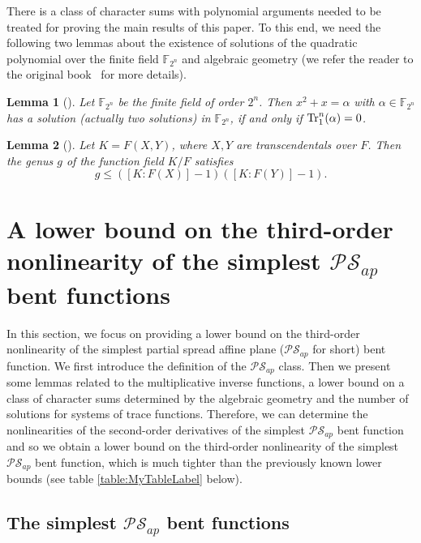 \documentclass{article}
\newcommand{\F}{\mathbb{F}}
\newcommand{\0}{\textbf{0}}
\newcommand{\1}{\textbf{1}}
\theoremstyle{plain}
\newtheorem{lemma}{Lemma}
\begin{document}
    There is a class of character sums with polynomial arguments needed to be treated for proving the main results of this paper.
    To this end, we need the following two lemmas about the existence of solutions of the quadratic polynomial over the finite field $\F_{2^n}$ and algebraic geometry (we refer the reader to the original book~\cite{Stichtenoth2008book_algebraicfunctionfieldsandcodes} for more details).
    \begin{lemma}[\cite{Lidl1997FiniteFieldBook}]\label{lemma:hilbert90}
        Let $\F_{2^n}$ be the finite field of order $2^n$.
        Then $x^2+x=\alpha$ with $\alpha\in\F_{2^n}$ has a solution (actually two solutions) in $\F_{2^n}$, if and only if $\Tr_1^n(\alpha)=0$.
    \end{lemma}
    \begin{lemma}[\cite{Stichtenoth2008book_algebraicfunctionfieldsandcodes}]\label{L:genus_K_F}
        Let $K=F(X,Y)$, where $X,Y$ are transcendentals over $F$.
        Then the genus $g$ of the function field $K/F$ satisfies
        \[g\le ([K : F(X)] - 1)([K : F(Y)] - 1).\]
    \end{lemma}

\section{A lower bound on the third-order nonlinearity of the simplest $\mathcal{PS}_{ap}$ bent functions}

In this section, we focus on providing a lower bound on the third-order nonlinearity of the simplest
partial spread affine plane ($\mathcal{PS}_{ap}$ for short) bent function.
We first introduce the definition of the $\mathcal{PS}_{ap}$ class.
Then we present some lemmas related to the multiplicative inverse functions,
a lower bound on a class of character sums determined by the algebraic geometry
and the number of solutions for systems of trace functions.
Therefore, we can determine the nonlinearities of the second-order derivatives of the simplest $\mathcal{PS}_{ap}$ bent function
and so we obtain a lower bound on the third-order nonlinearity of the simplest $\mathcal{PS}_{ap}$
bent function, which is much tighter than the previously known lower bounds (see table \ref{table:MyTableLabel} below).

  \subsection{The simplest $\mathcal{PS}_{ap}$ bent functions}
\end{document}
